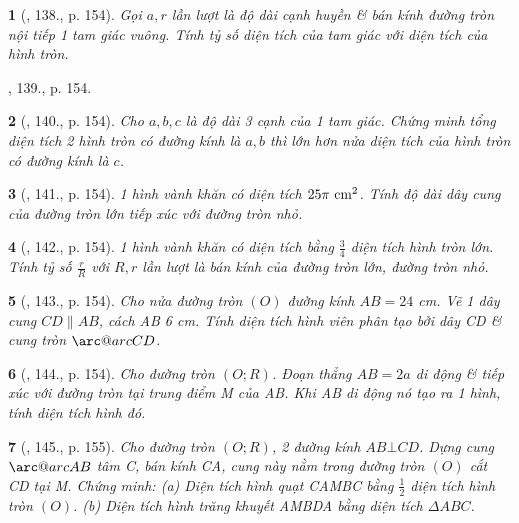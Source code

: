 \documentclass{article}
\makeatletter
\newcommand{\arc@char}{{\usefont{U}{tipa}{m}{n}\symbol{62}}}%
\newcommand{\arc}[1]{\mathpalette\arc@arc{#1}}
\newcommand{\arc@arc}[2]{%
	\sbox0{$\m@th#1#2$}%
	\vbox{
		\hbox{\resizebox{\wd0}{\height}{\arc@char}}
		\nointerlineskip
		\box0
	}%
}
\newtheorem{baitoan}{}
\makeatother
\begin{document}
\begin{baitoan}[\cite{Tuyen_Toan_9_old}, 138., p. 154]
	Gọi $a,r$ lần lượt là độ dài cạnh huyền \& bán kính đường tròn nội tiếp 1 tam giác vuông. Tính tỷ số diện tích của tam giác với diện tích của hình tròn.
\end{baitoan}
\noindent\cite{Tuyen_Toan_9_old}, 139., p. 154.

\begin{baitoan}[\cite{Tuyen_Toan_9_old}, 140., p. 154]
	Cho $a,b,c$ là độ dài 3 cạnh của 1 tam giác. Chứng minh tổng diện tích 2 hình tròn có đường kính là $a,b$ thì lớn hơn nửa diện tích của hình tròn có đường kính là $c$.
\end{baitoan}

\begin{baitoan}[\cite{Tuyen_Toan_9_old}, 141., p. 154]
	1 hình vành khăn có diện tích $25\pi\ {\rm cm}^2$. Tính độ dài dây cung của đường tròn lớn tiếp xúc với đường tròn nhỏ.
\end{baitoan}

\begin{baitoan}[\cite{Tuyen_Toan_9_old}, 142., p. 154]
	1 hình vành khăn có diện tích bằng $\frac{3}{4}$ diện tích hình tròn lớn. Tính tỷ số $\frac{r}{R}$ với $R,r$ lần lượt là bán kính của đường tròn lớn, đường tròn nhỏ.
\end{baitoan}

\begin{baitoan}[\cite{Tuyen_Toan_9_old}, 143., p. 154]
	Cho nửa đường tròn $(O)$ đường kính $AB = 24$ {\rm cm}. Vẽ 1 dây cung $CD\parallel AB$, cách AB {\rm6 cm}. Tính diện tích hình viên phân tạo bởi dây CD \& cung tròn $\arc{CD}$.
\end{baitoan}

\begin{baitoan}[\cite{Tuyen_Toan_9_old}, 144., p. 154]
	Cho đường tròn $(O;R)$. Đoạn thẳng $AB = 2a$ di động \& tiếp xúc với đường tròn tại trung điểm M của AB. Khi AB di động nó tạo ra 1 hình, tính diện tích hình đó.
\end{baitoan}

\begin{baitoan}[\cite{Tuyen_Toan_9_old}, 145., p. 155]
	Cho đường tròn $(O;R)$, 2 đường kính $AB\bot CD$. Dựng cung $\arc{AB}$ tâm C, bán kính CA, cung này nằm trong đường tròn $(O)$ cắt CD tại M. Chứng minh: (a) Diện tích hình quạt CAMBC bằng $\frac{1}{2}$ diện tích hình tròn $(O)$. (b) Diện tích hình trăng khuyết AMBDA bằng diện tích $\Delta ABC$.
\end{baitoan}
\end{document}
